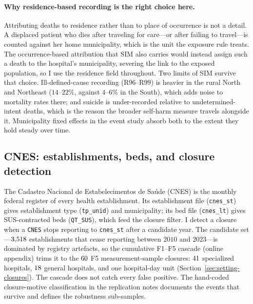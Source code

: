 \paragraph{Why residence-based recording is the right choice here.}
Attributing deaths to residence rather than to place of occurrence is not
a detail. A displaced patient who dies after traveling for care---or after
failing to travel---is counted against her home municipality, which is the
unit the exposure rule treats. The occurrence-based attribution that SIM
also carries would instead assign such a death to the hospital's
municipality, severing the link to the exposed population, so I use the
residence field throughout. Two limits of SIM survive that choice.
Ill-defined-cause recording (R$96$--R$99$) is heavier in the rural North
and Northeast ($14$--$22\%$, against $4$--$6\%$ in the South), which adds
noise to mortality rates there; and suicide is under-recorded relative to
undetermined-intent deaths, which is the reason the broader self-harm
measure travels alongside it. Municipality fixed effects in the event
study absorb both to the extent they hold steady over time.

\subsection{CNES: establishments, beds, and closure detection}
\label{sec:data-cnes}

The Cadastro Nacional de Estabelecimentos de Saúde (CNES) is the monthly
federal register of every health establishment. Its establishment file
(\texttt{cnes\_st}) gives establishment type (\texttt{tp\_unid}) and
municipality; its bed file (\texttt{cnes\_lt}) gives SUS-contracted beds
(\texttt{QT\_SUS}), which feed the closure filter. I detect a closure when
a \texttt{CNES} stops reporting to \texttt{cnes\_st} after a candidate
year. The candidate set---$3{,}518$ establishments that cease reporting between
$2010$ and $2023$---is dominated by registry artefacts, so the cumulative
F1--F5 cascade (online appendix) trims it to the $60$ F5
measurement-sample closures: $41$ specialized hospitals,
$18$ general hospitals, and one hospital-day unit
(Section~\ref{sec:setting-closures}). The cascade does not catch every
false positive. The hand-coded closure-motive classification in the
replication notes documents the events that survive and defines the
robustness sub-samples.

